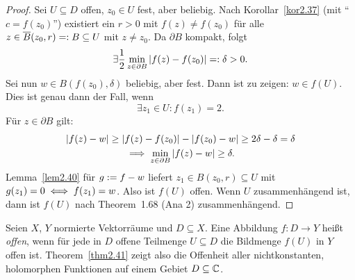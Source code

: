 \documentclass[a4paper,twoside,DIV15,BCOR12mm]{scrbook}
\begin{document}
\begin{kor}[Nullstellensatz]\label{kor2.36}
\end{kor}

\begin{kor}\label{kor2.37}
\end{kor}

\begin{kor}\label{2.38}
\end{kor}

\begin{bsp}\label{bsp2.39}
\end{bsp}

\begin{lem}\label{lem2.40}
\end{lem}

\begin{thm}[Gebietstreue]\label{thm2.41}
\end{thm}
\begin{proof} Sei $U\subseteq D$ offen, $z_0\in U$ fest, aber 
beliebig. Nach Korollar~\ref{kor2.37} (mit "`$c=f(z_0)$"') existiert 
ein $r>0$ mit $f(z)\neq f(z_0)$ für alle $z\in\overline{B}(z_0,r)=: B
\subseteq U$ mit $z\neq z_0$. Da $\partial B$ kompakt, folgt
\[\exists\frac{1}{2}\min_{z\in\partial B}\left\lvert f(z)-f(z_0)\right\lvert=:\delta >0.\]
Sei nun $w\in B(f(z_0),\delta)$ beliebig, aber fest. Dann ist zu 
zeigen: $w\in f(U)$. Dies ist genau dann der Fall, wenn
\[\exists z_1\in U: f(z_1)=2.\]
Für $z\in\partial B$ gilt:
\begin{gather*}\left\lvert f(z)-w\right\lvert\geq\left\lvert f(z)-f(z_0)\right\lvert-\left\lvert f(z_0)-w\right\lvert\geq 
2\delta - \delta = \delta\\
\implies \min_{z\in\partial B}\left\lvert f(z)-w\right\lvert\geq\delta.\end{gather*}
Lemma~\ref{lem2.40} für $g:= f-w$ liefert $z_1\in B(z_0,r)
\subseteq U$ mit $g(z_1)=0\iff f(z_1)=w$. Also ist $f(U)$ offen. 
Wenn $U$ zusammenhängend ist, dann ist $f(U)$ nach Theorem~1.68 (Ana 2) zusammenhängend.
\end{proof}

\begin{bem*}
  Seien $X$, $Y$ normierte Vektorräume und $D\subseteq X$. Eine Abbildung $f\colon D\to Y$ heißt \emph{offen}, wenn für jede in
  $D$ offene Teilmenge $U\subseteq D$ die Bildmenge $f(U)$ in $Y$ offen ist. Theorem~\ref{thm2.41} zeigt also die Offenheit
  aller nichtkonstanten, holomorphen Funktionen auf einem Gebiet $D\subseteq\mathbb{C}$.
\end{bem*}
\end{document}
